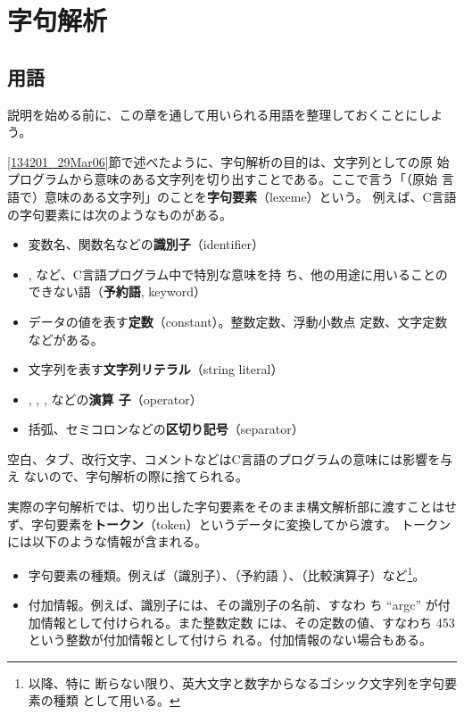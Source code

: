 
\chapter{字句解析}
\label{103559_30Mar06}

\section{用語}

説明を始める前に、この章を通して用いられる用語を整理しておくことにしよう。

\ref{134201_29Mar06}節で述べたように、字句解析の目的は、文字列としての原
始プログラムから意味のある文字列を切り出すことである。ここで言う「（原始
言語で）意味のある文字列」のことを{\bfseries 字句要素}（lexeme）という。
例えば、C言語の字句要素には次のようなものがある。
\begin{itemize}
 \item 変数名、関数名などの{\bfseries 識別子}（identifier）
 \item {}, など、C言語プログラム中で特別な意味を持
       ち、他の用途に用いることのできない語（{\bfseries 予約語}, keyword）
 \item データの値を表す{\bfseries 定数}（constant）。整数定数、浮動小数点
       定数、文字定数などがある。
 \item 文字列を表す{\bfseries 文字列リテラル}（string literal）
 \item \icode{+}, \icode{*}, \icode{=}, \icode{==}などの{\bfseries 演算
       子}（operator）
 \item 括弧、セミコロンなどの{\bfseries 区切り記号}（separator）
\end{itemize}
空白、タブ、改行文字、コメントなどはC言語のプログラムの意味には影響を与え
ないので、字句解析の際に捨てられる。

実際の字句解析では、切り出した字句要素をそのまま構文解析部に渡すことはせ
ず、字句要素を{\bfseries トークン}（token）というデータに変換してから渡す。
トークンには以下のような情報が含まれる。
\begin{itemize}
 \item 字句要素の種類。例えば（識別子）、（予約語
       ）、（比較演算子）など\footnote{以降、特に
       断らない限り、英大文字と数字からなるゴシック文字列を字句要素の種類
       として用いる。}。
 \item 付加情報。例えば、識別子には、その識別子の名前、すなわ
       ち ``argc'' が付加情報として付けられる。また整数定数 
       には、その定数の値、すなわち 453 という整数が付加情報として付けら
       れる。付加情報のない場合もある。
\end{itemize}

